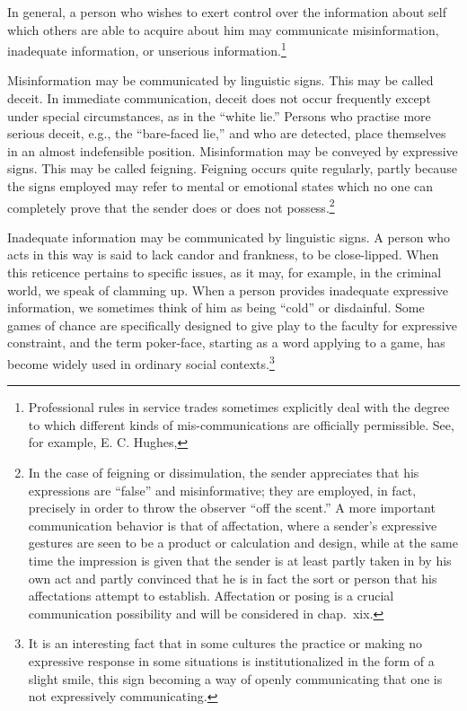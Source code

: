 \documentclass[twoside,symmetric,nobib,justified]{tufte-book}
\begin{document}
In general, a person who wishes to exert control over the information
about self which others are able to acquire about him may communicate
misinformation, inadequate information, or unserious
information.\footnote{Professional rules in service trades sometimes
  explic­itly deal with the degree to which different kinds of
  mis-communications are officially permissible. See, for example, E. C.
  Hughes,}

Misinformation may be communicated by linguistic signs. This may be
called deceit. In immediate communication, deceit does not occur
frequently except under special circumstances, as in the ``white lie.''
Persons who practise more serious deceit, e.g., the ``bare-faced lie,''
and who are detected, place them­selves in an almost indefensible
position. Misinformation may be conveyed by expressive signs. This may
be called feigning. Feigning occurs quite regularly, partly because the
signs em­ployed may refer to mental or emotional states which no one can
completely prove that the sender does or does not possess.\footnote{In
  the case of feigning or dissimulation, the sender appreciates that his
  expressions are ``false'' and misinformative; they are employed, in
  fact, precisely in order to throw the observer ``off the scent.'' A
  more important communication be­havior is that of affectation, where a
  sender's expressive ges­tures are seen to be a product or calculation
  and design, while at the same time the impression is given that the
  sender is at least partly taken in by his own act and partly convinced
  that he is in fact the sort or person that his affectations attempt to
  establish. Affectation or posing is a crucial communication
  possibility and will be considered in chap.~xix.}

Inadequate information may be communicated by linguistic signs. A person
who acts in this way is said to lack candor and frankness, to be
close-lipped. When this reticence pertains to specific issues, as it
may, for example, in the criminal world, we speak of clamming up. When a
person provides inadequate ex­pressive information, we sometimes think of
him as being ``cold'' or disdainful. Some games of chance are
specifically designed to give play to the faculty for expressive
constraint, and the term poker-face, starting as a word applying to a
game, has become widely used in ordinary social contexts.\footnote{It is
  an interesting fact that in some cultures the practice or making no
  expressive response in some situations is institutionalized in the
  form of a slight smile, this sign be­coming a way of openly
  communicating that one is not expressively communicating.}
\end{document}
